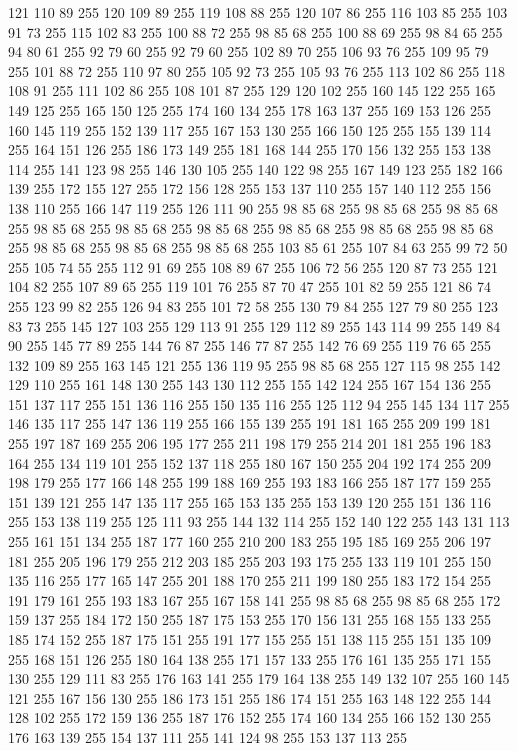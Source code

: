 121 110 89 255 120 109 89 255 119 108 88 255 120 107 86 255 116 103 85 255 103 91 73 255 115 102 83 255 100 88 72 255 98 85 68 255 100 88 69 255 98 84 65 255 94 80 61 255 92 79 60 255 92 79 60 255 102 89 70 255 106 93 76 255 109 95 79 255 101 88 72 255 110 97 80 255 105 92 73 255 105 93 76 255 113 102 86 255 118 108 91 255 111 102 86 255 108 101 87 255 129 120 102 255 160 145 122 255 165 149 125 255 165 150 125 255 174 160 134 255 178 163 137 255 169 153 126 255 160 145 119 255 152 139 117 255 167 153 130 255 166 150 125 255 155 139 114 255 164 151 126 255 186 173 149 255 181 168 144 255 170 156 132 255 153 138 114 255 141 123 98 255 146 130 105 255 140 122 98 255 167 149 123 255 182 166 139 255 172 155 127 255 172 156 128 255 153 137 110 255 157 140 112 255 156 138 110 255 166 147 119 255 126 111 90 255 98 85 68 255 98 85 68 255 98 85 68 255 98 85 68 255 98 85 68 255 98 85 68 255 98 85 68 255 98 85 68 255 98 85 68 255 98 85 68 255
98 85 68 255 98 85 68 255 103 85 61 255 107 84 63 255 99 72 50 255 105 74 55 255 112 91 69 255 108 89 67 255 106 72 56 255 120 87 73 255 121 104 82 255 107 89 65 255 119 101 76 255 87 70 47 255 101 82 59 255 121 86 74 255 123 99 82 255 126 94 83 255 101 72 58 255 130 79 84 255 127 79 80 255 123 83 73 255 145 127 103 255 129 113 91 255 129 112 89 255 143 114 99 255 149 84 90 255 145 77 89 255 144 76 87 255 146 77 87 255 142 76 69 255 119 76 65 255 132 109 89 255 163 145 121 255 136 119 95 255 98 85 68 255 127 115 98 255 142 129 110 255 161 148 130 255 143 130 112 255 155 142 124 255 167 154 136 255 151 137 117 255 151 136 116 255 150 135 116 255 125 112 94 255 145 134 117 255 146 135 117 255 147 136 119 255 166 155 139 255 191 181 165 255 209 199 181 255 197 187 169 255 206 195 177 255 211 198 179 255 214 201 181 255 196 183 164 255 134 119 101 255 152 137 118 255 180 167 150 255 204 192 174 255 209 198 179 255 177 166 148 255 199 188 169 255
193 183 166 255 187 177 159 255 151 139 121 255 147 135 117 255 165 153 135 255 153 139 120 255 151 136 116 255 153 138 119 255 125 111 93 255 144 132 114 255 152 140 122 255 143 131 113 255 161 151 134 255 187 177 160 255 210 200 183 255 195 185 169 255 206 197 181 255 205 196 179 255 212 203 185 255 203 193 175 255 133 119 101 255 150 135 116 255 177 165 147 255 201 188 170 255 211 199 180 255 183 172 154 255 191 179 161 255 193 183 167 255 167 158 141 255 98 85 68 255 98 85 68 255 172 159 137 255 184 172 150 255 187 175 153 255 170 156 131 255 168 155 133 255 185 174 152 255 187 175 151 255 191 177 155 255 151 138 115 255 151 135 109 255 168 151 126 255 180 164 138 255 171 157 133 255 176 161 135 255 171 155 130 255 129 111 83 255 176 163 141 255 179 164 138 255 149 132 107 255 160 145 121 255 167 156 130 255 186 173 151 255 186 174 151 255 163 148 122 255 144 128 102 255 172 159 136 255 187 176 152 255 174 160 134 255 166 152 130 255 176 163 139 255 154 137 111 255 141 124 98 255 153 137 113 255
